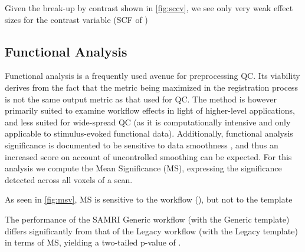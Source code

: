 
Given the break-up by contrast shown in \cref{fig:sccv}, we see only very weak effect sizes for the contrast variable
(SCF of )




\subsection{Functional Analysis}

Functional analysis is a frequently used avenue for preprocessing QC.
Its viability derives from the fact that the metric being maximized in the registration process is not the same output metric as that used for QC.
The method is however primarily suited to examine workflow effects in light of higher-level applications, and less suited for wide-spread QC (as it is computationally intensive and only applicable to stimulus-evoked functional data).
Additionally, functional analysis significance is documented to be sensitive to data smoothness \cite{Molloy2014}, and thus an increased score on account of uncontrolled smoothing can be expected.
For this analysis we compute the Mean Significance (MS), expressing the significance detected across all voxels of a scan.

As seen in \cref{fig:msv}, MS is sensitive to
the workflow
(),
but not to the template


The performance of the SAMRI Generic workflow (with the Generic template) differs significantly from that of the Legacy workflow (with the Legacy template) in terms of MS, yielding a two-tailed p-value of .

